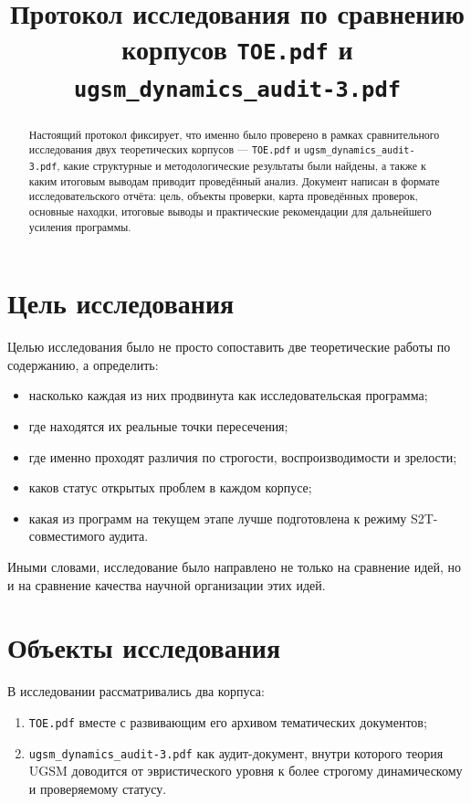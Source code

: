 \documentclass[12pt,a4paper]{article}
\title{Протокол исследования по сравнению корпусов \texttt{TOE.pdf} и \texttt{ugsm\_dynamics\_audit-3.pdf}}
\author{}
\date{}
\begin{document}
\maketitle

\begin{abstract}
Настоящий протокол фиксирует, что именно было проверено в рамках сравнительного исследования двух теоретических корпусов --- \texttt{TOE.pdf} и \texttt{ugsm\_dynamics\_audit-3.pdf}, какие структурные и методологические результаты были найдены, а также к каким итоговым выводам приводит проведённый анализ. Документ написан в формате исследовательского отчёта: цель, объекты проверки, карта проведённых проверок, основные находки, итоговые выводы и практические рекомендации для дальнейшего усиления программы.
\end{abstract}

\section{Цель исследования}

Целью исследования было не просто сопоставить две теоретические работы по содержанию, а определить:
\begin{itemize}
    \item насколько каждая из них продвинута как исследовательская программа;
    \item где находятся их реальные точки пересечения;
    \item где именно проходят различия по строгости, воспроизводимости и зрелости;
    \item каков статус открытых проблем в каждом корпусе;
    \item какая из программ на текущем этапе лучше подготовлена к режиму S2T-совместимого аудита.
\end{itemize}

Иными словами, исследование было направлено не только на сравнение идей, но и на сравнение качества научной организации этих идей.

\section{Объекты исследования}

В исследовании рассматривались два корпуса:
\begin{enumerate}
    \item \texttt{TOE.pdf} вместе с развивающим его архивом тематических документов;
    \item \texttt{ugsm\_dynamics\_audit-3.pdf} как аудит-документ, внутри которого теория UGSM доводится от эвристического уровня к более строгому динамическому и проверяемому статусу.
\end{enumerate}
\end{document}
